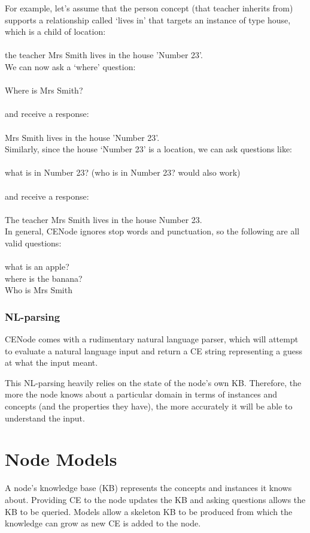 \documentclass{scrartcl}
\newcommand{\ce}[1]{\textsf{#1}}
\begin{document}
For example, let's assume that the \ce{person} concept (that \ce{teacher} inherits from) supports a relationship called `lives in' that targets an instance of type \ce{house}, which is a child of \ce{location}:\\
\\\ce{the teacher Mrs Smith lives in the house 'Number 23'.}\\

We can now ask a `where' question:\\
\\\ce{Where is Mrs Smith?}\\
\\and receive a response:\\
\\\ce{Mrs Smith lives in the house 'Number 23'.}\\

Similarly, since the house `Number 23' is a location, we can ask questions like:\\
\\\ce{what is in Number 23?} (\ce{who is in Number 23?} would also work)\\
\\and receive a response:\\
\\\ce{The teacher Mrs Smith lives in the house Number 23.}\\

In general, CENode ignores stop words and punctuation, so the following are all valid questions:\\
\\\ce{what is an apple?}\\
\ce{where is the banana?}\\
\ce{Who is Mrs Smith}

\subsubsection{NL-parsing}
CENode comes with a rudimentary natural language parser, which will attempt to evaluate a natural language input and return a CE string representing a guess at what the input meant.

This NL-parsing heavily relies on the state of the node's own KB. Therefore, the more the node knows about a particular domain in terms of instances and concepts (and the properties they have), the more accurately it will be able to understand the input.


\section{Node Models}
\label{models}
A node's knowledge base (KB) represents the concepts and instances it knows about. Providing CE to the node updates the KB and asking questions allows the KB to be queried. Models allow a skeleton KB to be produced from which the knowledge can grow as new CE is added to the node.
\end{document}
